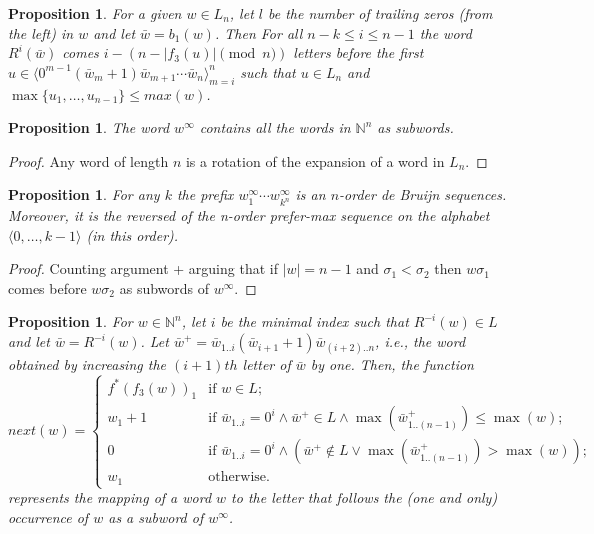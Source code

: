 \documentclass{article}
\newtheorem{proposition}[theorem]{Proposition}
\theoremstyle{definition}
\newcommand{\N}{{\mathbb{N}}}
\newcommand{\T}[1]{\langle{#1}\rangle}
\newcommand{\rr}[2]{R^{#2}({#1})}
\newcommand{\rl}[2]{R^{-{#2}}({#1})}
\begin{document}
\begin{proposition}\label{advanced-pos}
	For a given $w \in L_n$, let $l$ be the number of trailing zeros (from the left) in $w$ and let $\bar{w}=b_1(w)$. Then For all $n-k \leq i \leq n-1$ the word $\rr{\bar{w}}{i}$ comes $i-(n-|f_3(u)| \pmod n)$ letters before the first $u \in \T{0^{m-1} (\bar{w}_{m} + 1) \bar{w}_{m+1}\cdots \bar{w}_n}_{m=i}^{n}$ such that $u \in L_n$ and  $\max\{u_1,\dots,u_{n-1}\} \leq max(w)$.
\end{proposition}


\begin{proposition}
	The word $w^\infty$ contains all the words in $\N^n$ as subwords.
\end{proposition}
\begin{proof}
	Any word of length $n$ is a rotation of the expansion of a word in $L_n$.
\end{proof}


\begin{proposition}
	For any $k$ the prefix $w^\infty_1 \cdots w^\infty_{k^n}$ is an $n$-order de Bruijn sequences. Moreover, it is the reversed of the n-order prefer-max sequence on the alphabet $\T{0,\dots,k-1}$ (in this order). 
\end{proposition}
\begin{proof}
	Counting argument + arguing that if $|w| =n-1$ and $\sigma_1 < \sigma_2$ then $w\sigma_1$ comes before $w\sigma_2$ as subwords of $w^\infty$.
\end{proof}


\begin{proposition}
	For $w \in \N^n$, let $i$ be the minimal index such that $\rl{w}{i} \in L$ and let $\bar{w}=\rl{w}{i}$. Let $\bar{w}^+=\bar{w}_{1..i}(\bar{w}_{i+1}+1)\bar{w}_{(i+2)..n}$, i.e., the word obtained by increasing the $(i+1)th$ letter of $\bar{w}$ by one.  Then, the function
	$$next(w)=
	\begin{cases}
	f^*(f_3(w))_1 & \text{if } w \in L; \\
	w_1+1         & \text{if }\bar{w}_{1..i}= 0^i \wedge \bar{w}^+ \in L\wedge \max{(\bar{w}^+_{1..(n-1)})} \leq \max(w); \\
	0             & \text{if }\bar{w}_{1..i}= 0^i \wedge (\bar{w}^+ \notin L \vee \max{(\bar{w}^+_{1..(n-1)})} > \max(w)); \\
	w_1           & \text{otherwise.}
	\end{cases}$$
	represents the mapping of a word $w$ to the letter that follows the (one and only) occurrence of $w$ as a subword of $w^\infty$.
\end{proposition}
\end{document}
